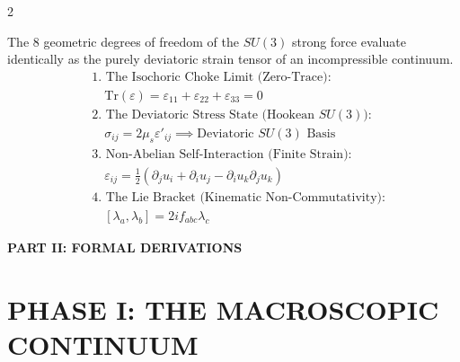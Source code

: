 \documentclass[11pt, a4paper]{article}
\newcounter{cheatnum}
\begin{document}
\begin{multicols}{2}
\begin{tcolorbox}[cheatbox, title={\refstepcounter{cheatnum}\label{box:hookes_su3}\thecheatnum. Generalized Hooke's Law \& $SU(3)$ \scriptsize\hfill\hyperref[sec:deriv_hookes_su3]{[Proof $\downarrow$]}}]
The 8 geometric degrees of freedom of the $SU(3)$ strong force evaluate identically as the purely deviatoric strain tensor of an incompressible continuum.
\begin{align}
    &\text{1. The Isochoric Choke Limit (Zero-Trace):} \nonumber \\
    &\quad \text{Tr}(\varepsilon) = \varepsilon_{11} + \varepsilon_{22} + \varepsilon_{33} = 0 \label{eq:isochoric_trace} \\
    &\text{2. The Deviatoric Stress State (Hookean $SU(3)$):} \nonumber \\
    &\quad \sigma_{ij} = 2\mu_s \varepsilon'_{ij} \implies \text{Deviatoric } SU(3) \text{ Basis} \label{eq:deviatoric_stress} \\
    &\text{3. Non-Abelian Self-Interaction (Finite Strain):} \nonumber \\
    &\quad \varepsilon_{ij} = \frac{1}{2} \left( \partial_j u_i + \partial_i u_j - \partial_i u_k \partial_j u_k \right) \label{eq:su3_finite_strain} \\
    &\text{4. The Lie Bracket (Kinematic Non-Commutativity):} \nonumber \\
    &\quad [\lambda_a, \lambda_b] = 2i f_{abc} \lambda_c \label{eq:non_abelian_commutator}
\end{align}
\end{tcolorbox}

\end{multicols}

\newpage
\begin{center}
    \LARGE\textbf{PART II: FORMAL DERIVATIONS}
    \label{sec:part2}
\end{center}
\vspace{0.4cm}


\part*{PHASE I: THE MACROSCOPIC CONTINUUM}
\end{document}
